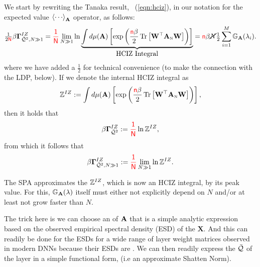 We start by rewriting the Tanaka result, \EQN~(\ref{eqn:hciz}),
in our notation for the expected value $\Expected[\AMAT]{\cdots}$ operator, as follows:
\begin{equation}
\label{eqn:hciz2}
  \tfrac{1}{2{\color{red}\sf{N}}}\beta\mathbf{\Gamma}^{IZ}_{\bar{\mathcal{Q}}^{2},N\gg 1} = 
  {\color{red}\sf{\frac{1}{N}}}\lim_{N\gg 1} \ln \underbrace{ \int d\mu(\mathbf{\mathbf{A}})\left[\exp\left(\frac{{\color{red}\sf{n}}\beta}{2}\mbox{}\operatorname{Tr}\left[\mathbf{W}^{\top}{\mathbf{A}}_{\text{\tiny N}}\mathbf{W}\right]\right)\right] }_{\mbox{HCIZ Integral}} 
  = {\color{red}\sf{n}}\beta \cancel{N}\tfrac{1}{2}\sum_{i=1}^{M}\mathbb{G}_{\mathbf{A}}(\lambda_{i})   .
\end{equation}
where we have added a $\tfrac{1}{2}$ for technical convenience (to make the connection with the LDP, below).
If we denote the internal HCIZ integral as 
\begin{equation}
\label{eqn:hciz_def}
  \mathbb{Z}^{IZ} := \int d\mu(\mathbf{\mathbf{A}})\left[\exp\left(\frac{{\color{red}\sf{n}}\beta}{2}\mbox{}\operatorname{Tr}\left[\mathbf{W}^{\top}{\mathbf{A}}_{\text{\tiny N}}\mathbf{W}\right]\right)\right]  ,
 \end{equation}
then it holds that 
\begin{equation}
  \label{eqn:hciz_def2}
  \beta\mathbf{\Gamma}^{IZ}_{\bar{\mathcal{Q}}^{2}} :=  {\color{red}\sf{\frac{1}{N}}}\ln\mathbb{Z}^{IZ}  ,
\end{equation}
from which it follows that %
\begin{equation}
\label{eqn:hciz_def3}
  \beta\mathbf{\Gamma}^{IZ}_{\bar{\mathcal{Q}}^{2},N\gg 1} := {\color{red}\sf{\frac{1}{N}}}\lim_{N \gg 1} \ln\mathbb{Z}^{IZ}  .
\end{equation}

The SPA approximates the \PartitionFunction $\mathbb{Z}^{IZ}$, which is now an HCIZ integral,  by its peak value.
For this, $\mathbb{G}_{\mathbf{A}}(\lambda)$ itself must either not explicitly depend on $N$ and/or at least not grow faster than $N$.

The trick here is we can choose an \RTransform of $\mathbf{\mathbf{A}}$
that is a simple analytic expression based on the observed
empirical spectral density (ESD) of the $\mathbf{X}$.
And this can readily be done for the ESDs for a wide range of layer weight matrices
observed in modern DNNs because their ESDs are \HeavyTailed \PowerLaw\cite{MM19_HTSR_ICML}.
We can then readily express the \Quality $\bar{\mathcal{Q}}$ of the \Teacher
layer in a simple functional form, (i.e  an approximate Shatten Norm).

